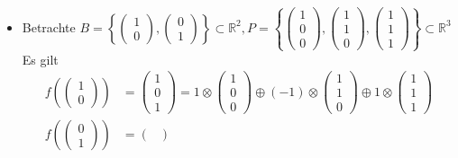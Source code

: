 \documentclass[a5paper, 10pt]{book}
\newcommand{\circleplus}{\oplus}%
\newcommand{\circlecdot}{\otimes}%
\begin{document}
\begin{itemize}
						\item Betrachte $B = \left\{ \begin{pmatrix} 1 \\ 0 \end{pmatrix}, \begin{pmatrix} 0 \\ 1 \end{pmatrix} \right\} \subset \mathbb{R}^2, P = \left\{ \begin{pmatrix} 1 \\ 0 \\ 0 \end{pmatrix}, \begin{pmatrix} 1 \\ 1 \\ 0 \end{pmatrix}, \begin{pmatrix} 1 \\ 1 \\ 1 \end{pmatrix} \right\} \subset \mathbb{R}^3$\\
						Es gilt
						\begin{align}
							f\left( \begin{pmatrix}
							1 \\ 0
							\end{pmatrix}  \right) &= \begin{pmatrix}
							1 \\ 0 \\ 1
							\end{pmatrix} = 1 \circlecdot \begin{pmatrix}
							1 \\ 0 \\ 0
							\end{pmatrix} \circleplus (-1) \circlecdot \begin{pmatrix}
							1 \\ 1 \\ 0
							\end{pmatrix} \circleplus 1 \circlecdot \begin{pmatrix}
							1 \\ 1 \\ 1
							\end{pmatrix}\\
							f\left( \begin{pmatrix}
							0 \\ 1
							\end{pmatrix}  \right) &= \begin{pmatrix}

\end{pmatrix}
\end{align}
\end{itemize}
\end{document}
